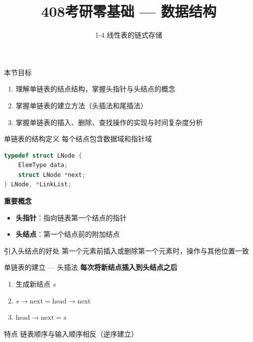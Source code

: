 \documentclass[10pt, aspectratio=169]{beamer}
\title{408考研零基础 --- 数据结构}
\subtitle{1-4 线性表的链式存储}
\author{}
\date{}
\begin{document}
\begin{frame}{本节目标}
    \begin{enumerate}
        \item 理解单链表的结点结构，掌握头指针与头结点的概念
        \item 掌握单链表的建立方法（头插法和尾插法）
        \item 掌握单链表的插入、删除、查找操作的实现与时间复杂度分析
    \end{enumerate}
\end{frame}

\begin{frame}[fragile]{单链表的结构定义}
    每个结点包含数据域和指针域
    \vspace{0.5em}
    \begin{lstlisting}[language=C, basicstyle=\ttfamily\small]
typedef struct LNode {
    ElemType data;
    struct LNode *next;
} LNode, *LinkList;
    \end{lstlisting}
    \vspace{0.5em}
    \textbf{重要概念}
    \begin{itemize}
        \item \textbf{头指针}：指向链表第一个结点的指针
        \item \textbf{头结点}：第一个结点前的附加结点
    \end{itemize}
    \vspace{0.3em}
    \begin{block}{引入头结点的好处}
        第一个元素前插入或删除第一个元素时，操作与其他位置一致
    \end{block}
\end{frame}

\begin{frame}{单链表的建立 --- 头插法}
    \textbf{每次将新结点插入到头结点之后}
    \vspace{0.5em}
    \begin{enumerate}
        \item 生成新结点 $s$
        \item $s \to \text{next} = \text{head} \to \text{next}$
        \item $\text{head} \to \text{next} = s$
    \end{enumerate}
    \vspace{0.5em}
    \begin{block}{特点}
        链表顺序与输入顺序相反（逆序建立）
    \end{block}
\end{frame}
\end{document}
